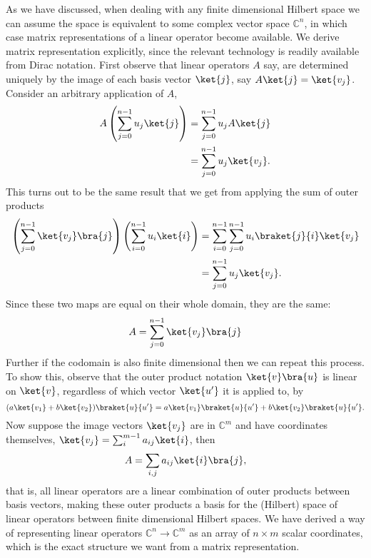As we have discussed, when dealing with any finite dimensional Hilbert space we can assume the space is equivalent to some complex vector space $\mathbb{C}^n$, in which case matrix representations of a linear operator become available. We derive matrix representation explicitly, since the relevant technology is readily available from Dirac notation. First observe that linear operators $A$ say, are determined uniquely by the image of each basis vector $\ket{j}$, say $A\ket{j} = \ket{v_j}$. Consider an arbitrary application of $A$,
\begin{align*}
	A\left(\sum_{j=0}^{n-1}u_j\ket{j}\right)
	&= \sum_{j=0}^{n-1}u_jA\ket{j}
	\\&= \sum_{j=0}^{n-1}u_j\ket{v_j}.
\end{align*}
This turns out to be the same result that we get from applying the sum of outer products
\begin{align*}
	\left(\sum_{j=0}^{n-1}\ket{v_j}\bra{j}\right)\left(\sum_{i=0}^{n-1}u_i\ket{i}\right)
	&= \sum_{i=0}^{n-1}\sum_{j=0}^{n-1}u_i\braket{j}{i}\ket{v_j}
	\\&= \sum_{j=0}^{n-1}u_j\ket{v_j}.
\end{align*}
Since these two maps are equal on their whole domain, they are the same:
\[A = \sum_{j=0}^{n-1} \ket{v_j}\bra{j}\]
Further if the codomain is also finite dimensional then we can repeat this process. To show this, observe that the outer product notation $\ket{v}\bra{u}$ is linear on $\ket{v}$, regardless of which vector $\ket{u'}$ it is applied to, by
\[(a\ket{v_1}+b\ket{v_2})\braket{u}{u'} = a\ket{v_1}\braket{u}{u'}+b\ket{v_2}\braket{u}{u'}.\]
Now suppose the image vectors $\ket{v_j}$ are in $\mathbb{C}^m$ and have coordinates themselves, $\ket{v_j} = \sum_i^{m-1} a_{ij}\ket{i}$, then
\begin{align*}
	A = \sum_{i,j} a_{ij}\ket{i}\bra{j},
\end{align*}
that is, all linear operators are a linear combination of outer products between basis vectors, making these outer products a basis for the (Hilbert) space of linear operators between finite dimensional Hilbert spaces. We have derived a way of representing linear operators $\mathbb{C}^n \to \mathbb{C}^m$ as an array of $n \times m$ scalar coordinates, which is the exact structure we want from a matrix representation.

